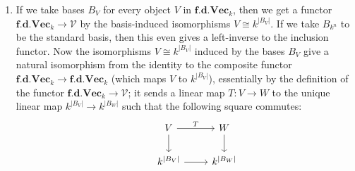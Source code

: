 \documentclass{report}
\newcommand{\cat}[1]{\mathbf{#1}} %
\begin{document}
\begin{enumerate}[label=\textbf{1.2.\Alph*.}]
	\item If we take bases $B_V$ for every object $V$ in $\cat{f.d.Vec}_k$, then
	      we get a functor $\cat{f.d.Vec}_k\to\mathscr{V}$ by the basis-induced
	      isomorphisms $V\cong k^{|B_V|}$. If we take $B_{k^n}$ to be the standard
	      basis, then this even gives a left-inverse to the inclusion functor. Now
	      the isomorphisms $V\cong k^{|B_V|}$ induced by the bases $B_V$ give a
	      natural isomorphism from the identity to the composite functor
	      $\cat{f.d.Vec}_k\to\cat{f.d.Vec}_k$ (which maps $V$ to $k^{|B_V|}$),
	      essentially by the definition of the functor
	      $\cat{f.d.Vec}_k\to\mathscr{V}$; it sends a linear map $T:V\to W$ to the
	      unique linear map $k^{|B_V|}\to k^{|B_W|}$ such that the following
	      square commutes:
	      \begin{equation*}
		      \begin{tikzcd}
			      &V \arrow{r}{T} \arrow{d}
			      &W \arrow{d} \\
			      &k^{|B_V|} \arrow{r}
			      &k^{|B_W|}
		      \end{tikzcd}
	      \end{equation*}

\end{enumerate}
\end{document}
